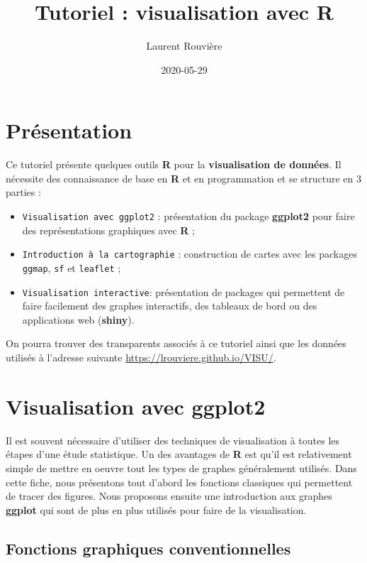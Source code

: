 \documentclass[]{book}
\title{Tutoriel : visualisation avec R}
\author{Laurent Rouvière}
\date{2020-05-29}
\providecommand{\tightlist}{%
  \setlength{\itemsep}{0pt}\setlength{\parskip}{0pt}}
\theoremstyle{definition}
\theoremstyle{definition}
\theoremstyle{definition}
\theoremstyle{remark}
\begin{document}
\maketitle

{
\setcounter{tocdepth}{1}
\tableofcontents
}
\hypertarget{Presentation}{%
\chapter*{Présentation}\label{Presentation}}

Ce tutoriel présente quelques outils \textbf{R} pour la \textbf{visualisation de données}. Il nécessite des connaissance de base en \textbf{R} et en programmation et se structure en 3 parties :

\begin{itemize}
\tightlist
\item
  \texttt{Visualisation\ avec\ ggplot2} : présentation du package \textbf{ggplot2} pour faire des représentations graphiques avec \textbf{R} ;
\item
  \texttt{Introduction\ à\ la\ cartographie} : construction de cartes avec les packages \texttt{ggmap}, \texttt{sf} et \texttt{leaflet} ;
\item
  \texttt{Visualisation\ interactive}: présentation de packages qui permettent de faire facilement des graphes interactifs, des tableaux de bord ou des applications web (\textbf{shiny}).
\end{itemize}

On pourra trouver des transparents associés à ce tutoriel ainsi que les données utilisés à l'adresse suivante \url{https://lrouviere.github.io/VISU/}.

\hypertarget{ggplot2}{%
\chapter{Visualisation avec ggplot2}\label{ggplot2}}

Il est souvent nécessaire d'utiliser des techniques de visualisation à toutes les étapes d'une étude statistique. Un des avantages de \textbf{R} est qu'il est relativement simple de mettre en oeuvre tout les types de graphes généralement utilisés. Dans cette fiche, nous présentons tout d'abord les fonctions classiques qui permettent de tracer des figures. Nous proposons ensuite une introduction aux graphes \textbf{ggplot} qui sont de plus en plus utilisés pour faire de la visualisation.

\hypertarget{fonctions-graphiques-conventionnelles}{%
\section{Fonctions graphiques conventionnelles}\label{fonctions-graphiques-conventionnelles}}
\end{document}
